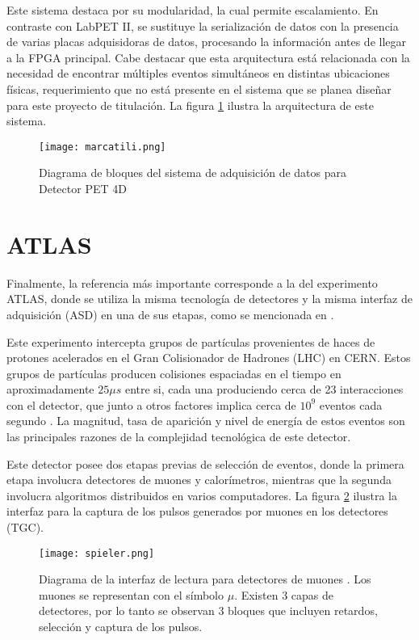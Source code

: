 	Este sistema destaca por su modularidad, la cual permite escalamiento. En contraste con LabPET II, se sustituye la serialización de datos con la presencia de varias placas adquisidoras de datos, procesando la información antes de llegar a la FPGA principal. Cabe destacar que esta arquitectura está relacionada con la necesidad de encontrar múltiples eventos simultáneos en distintas ubicaciones físicas, requerimiento que no está presente en el sistema que se planea diseñar para este proyecto de titulación. La figura \ref{fig:marcatili} ilustra la arquitectura de este sistema.
	
	\begin{figure}[h]
		\centering
		\texttt{[image: marcatili.png]}
		\caption{Diagrama de bloques del sistema de adquisición de datos para Detector PET 4D \cite{Marcatili2011DevelopmentDetector}}
		\label{fig:marcatili}
	\end{figure}
	
\newpage
\section{ATLAS}
	
	Finalmente, la referencia más importante corresponde a la del experimento ATLAS, donde se utiliza la misma tecnología de detectores y la misma interfaz de adquisición (ASD) en una de sus etapas, como se mencionada en \cite{Spieler2012ElectronicsAcquisition}.
	
	Este experimento intercepta grupos de partículas provenientes de haces de protones acelerados en el Gran Colisionador de Hadrones (LHC) en CERN. Estos grupos de partículas producen colisiones espaciadas en el tiempo en aproximadamente $25\mu s$ entre si, cada una produciendo cerca de 23 interacciones con el detector, que junto a otros factores implica cerca de $10^9$ eventos cada segundo \cite{Whiteson2016TheSystem}. La magnitud, tasa de aparición y nivel de energía de estos eventos son las principales razones de la complejidad tecnológica de este detector.
	
	Este detector posee dos etapas previas de selección de eventos, donde la primera etapa involucra detectores de muones y calorímetros, mientras que la segunda involucra algoritmos distribuidos en varios computadores. La figura \ref{fig:spieler} ilustra la interfaz para la captura de los pulsos generados por muones en los detectores (TGC).
	
	
	\begin{figure}[h]
		\centering
		\texttt{[image: spieler.png]}
		\caption{Diagrama de la interfaz de lectura para detectores de muones \cite{Spieler2012ElectronicsAcquisition}. Los muones se representan con el símbolo $\mu$. Existen 3 capas de detectores, por lo tanto se observan 3 bloques que incluyen retardos, selección y captura de los pulsos.}
		\label{fig:spieler}
	\end{figure}
	
